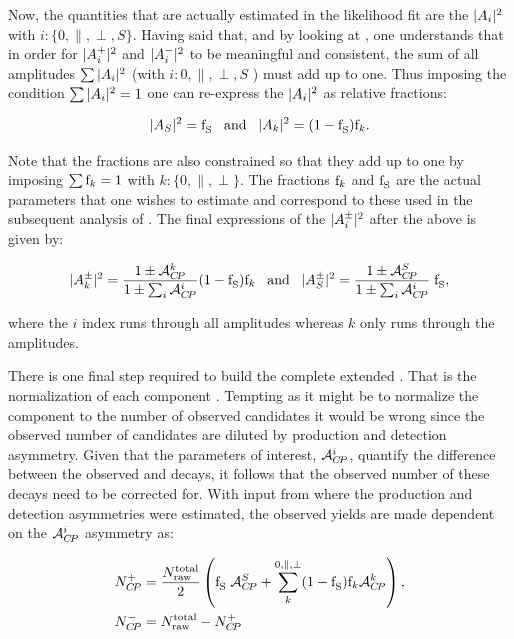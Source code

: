 \noindent Now, the quantities that are actually estimated in the likelihood fit are the $|{A}_{i}|^2$ with $i:\{0,\parallel,\perp,S\}$.
Having said that, and by looking at , one understands that in order for $|{A}_{i}^+|^2$ and $|{A}_{i}^-|^2$
to be meaningful and consistent, the sum of all amplitudes $\sum|{A}_{i}|^2$ (with $i:{0,\parallel,\perp,S}$ ) must add up to one.
Thus imposing the condition $\sum|{A}_{i}|^2 = 1$ one can re-express the $|{A}_{i}|^2$ as relative fractions:

\begin{equation}
|{A}_{S}|^2 = \text{f}_{\text{S}}^{} \;\;\;\text{and}\;\;\; |{A}_{k}|^2 = (1-\text{f}_{\text{S}}^{})\text{f}_{k}.
\label{amps_param}
\end{equation}

\noindent Note that the \pwave fractions are also constrained so that they add up to one by imposing $\sum\text{f}_{k}=1$ with $k:\{0,\parallel,\perp\}$.
The fractions $\text{f}_{k}$ and $\text{f}_{\text{S}}^{}$ are the actual parameters that one wishes to estimate and correspond to these used in the subsequent analysis of
. The final expressions of the $|{A}_{i}^{\pm}|^2$ after the above is given by:

\begin{equation}
|{A}_{k}^{\pm}|^2 = \frac{1\pm\mathcal{A}_{C\!P}^{k}}{1\pm\sum_i\mathcal{A}_{C\!P}^{i}}  (1-\text{f}_{\text{S}}^{})\text{f}_{k}  \;\;\; \text{and}\;\;\; |{A}_{S}^{\pm}|^2 = \frac{1\pm\mathcal{A}_{C\!P}^{S}}{1\pm\sum_i\mathcal{A}_{C\!P}^{i}} \; \text{f}_{\text{S}}^{},
\label{amps_final}
\end{equation}

\noindent where the $i$ index runs through all amplitudes whereas $k$ only runs through the \pwave amplitudes.

There is one final step required to build the complete extended \pdf. That is the normalization of each component \pdf. Tempting as it might be to
normalize the component \pdfs to the number of observed candidates it would be wrong since the observed number of candidates are diluted by production and detection
asymmetry. Given that the parameters of interest, $\mathcal{A}_{C\!P}^{i}$, quantify the difference between the observed \BsbarJpsiKst and \BsJpsiKst decays, it follows that
the observed number of these decays need to be corrected for. With input from  where the production and detection
asymmetries were estimated, the observed yields are made dependent on the $\mathcal{A}_{C\!P}^{i}$ asymmetry as:

\begin{subequations}
  \label{acp_yields}
  \begin{align}
    N^{+}_{C\!P} &= \frac{ N_{\text{raw}}^{\text{total}} }{2} \left( \text{f}_{\text{S}}^{}\; \mathcal{A}_{C\!P}^{S} + \sum_k^{0,\parallel,\perp} (1-\text{f}_{\text{S}}^{})\text{f}_{k}\mathcal{A}_{C\!P}^{k}  \right), \\
    N^{-}_{C\!P} &=  N_{\text{raw}}^{\text{total}} - N^{+}_{C\!P}
  \end{align}
\end{subequations}


